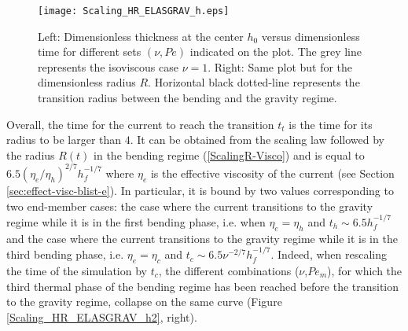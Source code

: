 \begin{figure}
  \begin{center}
    \graphicspath{ {/Users/thorey/Documents/These/Projet/Refroidissement/Skin_Model/Figure/JFM_V13/} }
    \texttt{[image: Scaling\_HR\_ELASGRAV\_h.eps]}
    \caption{Left: Dimensionless thickness at  the center $h_0$ versus
      dimensionless time  for different  sets $(\nu,Pe)$  indicated on
      the plot.  The grey line represents the isoviscous case $\nu=1$.
      Right:  Same   plot  but  for  the   dimensionless  radius  $R$.
      Horizontal  black dotted-line  represents the  transition radius
      between the bending and the gravity regime.}
    \label{Scaling_HR_ELASGRAV_h}
  \end{center}
\end{figure}

Overall, the time for the current to reach the transition $t_t$ is the
time for its radius to be larger than $4$. It can be obtained from the
scaling  law followed  by  the  radius $R(t)$  in  the bending  regime
(\ref{ScalingR-Visco})         and         is         equal         to
$6.5(\eta_e/\eta_h)^{2/7}h_f^{-1/7}$  where  $\eta_e$ is  the  effective
viscosity of the  current (see Section \ref{sec:effect-visc-blist-e}).
In  particular,  it  is  bound  by two  values  corresponding  to  two
end-member  cases:  the case  where  the  current transitions  to  the
gravity regime  while it  is in  the first  bending phase,  i.e.  when
$\eta_e= \eta_h$  and $t_h  \sim 6.5h_f^{-1/7}$ and  the case  where the
current transitions  to the gravity  regime while  it is in  the third
bending       phase,       i.e.       $\eta_e=       \eta_c$       and
$t_c \sim 6.5\nu^{-2/7}h_f^{-1/7}$.  Indeed,  when rescaling the time of
the simulation  by $t_c$,  the different  combinations ($\nu$,$Pe_m$),
for  which the  third thermal  phase of  the bending  regime has  been
reached before the  transition to the gravity regime,  collapse on the
same curve (Figure \ref{Scaling_HR_ELASGRAV_h2}, right).

